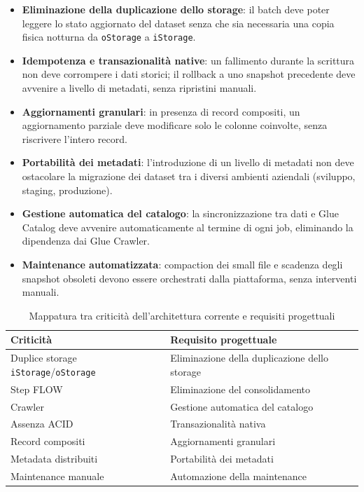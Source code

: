 \documentclass[12pt,a4paper,openright,twoside]{book}
\begin{document}
\begin{itemize}
    \item \textbf{Eliminazione della duplicazione dello storage}: il batch deve poter leggere lo stato aggiornato del dataset senza che sia necessaria una copia fisica notturna da \texttt{oStorage} a \texttt{iStorage}.
    \item \textbf{Idempotenza e transazionalità native}: un fallimento durante la scrittura non deve corrompere i dati storici; il rollback a uno snapshot precedente deve avvenire a livello di metadati, senza ripristini manuali.
    \item \textbf{Aggiornamenti granulari}: in presenza di record compositi, un aggiornamento parziale deve modificare solo le colonne coinvolte, senza riscrivere l'intero record.
    \item \textbf{Portabilità dei metadati}: l'introduzione di un livello di metadati non deve ostacolare la migrazione dei dataset tra i diversi ambienti aziendali (sviluppo, staging, produzione).
    \item \textbf{Gestione automatica del catalogo}: la sincronizzazione tra dati e Glue Catalog deve avvenire automaticamente al termine di ogni job, eliminando la dipendenza dai Glue Crawler.
    \item \textbf{Maintenance automatizzata}: compaction dei small file e scadenza degli snapshot obsoleti devono essere orchestrati dalla piattaforma, senza interventi manuali.
\end{itemize}

\begin{table}[H]
\centering\small
\begin{tabularx}{\textwidth}{X X}
\toprule
\textbf{Criticità} & \textbf{Requisito progettuale} \\
\midrule
Duplice storage \texttt{iStorage}/\texttt{oStorage} & Eliminazione della duplicazione dello storage \\[4pt]
Step FLOW                   & Eliminazione del consolidamento \\[4pt]
Crawler                     & Gestione automatica del catalogo \\[4pt]
Assenza ACID                & Transazionalità nativa \\[4pt]
Record compositi            & Aggiornamenti granulari \\[4pt]
Metadata distribuiti        & Portabilità dei metadati \\[4pt]
Maintenance manuale         & Automazione della maintenance \\
\bottomrule
\end{tabularx}
\caption{Mappatura tra criticità dell'architettura corrente e requisiti progettuali}
\label{tab:criticita-requisiti}
\end{table}
\end{document}
